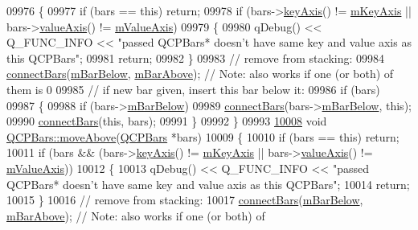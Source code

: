 \begin{DoxyCode}
09976 \{
09977   \textcolor{keywordflow}{if} (bars == \textcolor{keyword}{this}) \textcolor{keywordflow}{return};
09978   \textcolor{keywordflow}{if} (bars->\hyperlink{a00024_a72c7a09c22963f2c943f07112b311103}{keyAxis}() != \hyperlink{a00024_a692421b963472fa6e16156a74ba96832}{mKeyAxis} || bars->\hyperlink{a00024_a3106f9d34d330a6097a8ec5905e5b519}{valueAxis}() != 
      \hyperlink{a00024_acfc46d619ab9598be33b64146da45822}{mValueAxis})
09979   \{
09980     qDebug() << Q\_FUNC\_INFO << \textcolor{stringliteral}{"passed QCPBars* doesn't have same key and value axis as this QCPBars"};
09981     \textcolor{keywordflow}{return};
09982   \}
09983   \textcolor{comment}{// remove from stacking:}
09984   \hyperlink{a00027_a6ea37802cd22f97235cab614b14b9f19}{connectBars}(\hyperlink{a00027_a02eb7de7a2c03dc5699f329bb1c5f6e1}{mBarBelow}, \hyperlink{a00027_ade19776a2a6d393f15c0e27d4bb8e594}{mBarAbove}); \textcolor{comment}{// Note: also works if one (or both) of
       them is 0}
09985   \textcolor{comment}{// if new bar given, insert this bar below it:}
09986   \textcolor{keywordflow}{if} (bars)
09987   \{
09988     \textcolor{keywordflow}{if} (bars->\hyperlink{a00027_a02eb7de7a2c03dc5699f329bb1c5f6e1}{mBarBelow})
09989       \hyperlink{a00027_a6ea37802cd22f97235cab614b14b9f19}{connectBars}(bars->\hyperlink{a00027_a02eb7de7a2c03dc5699f329bb1c5f6e1}{mBarBelow}, \textcolor{keyword}{this});
09990     \hyperlink{a00027_a6ea37802cd22f97235cab614b14b9f19}{connectBars}(\textcolor{keyword}{this}, bars);
09991   \}
09992 \}
09993 
\hypertarget{a00115_source_l10008}{}\hyperlink{a00027_ac22e00a6a41509538c21b04f0a57318c}{10008} \textcolor{keywordtype}{void} \hyperlink{a00027_ac22e00a6a41509538c21b04f0a57318c}{QCPBars::moveAbove}(\hyperlink{a00027}{QCPBars} *bars)
10009 \{
10010   \textcolor{keywordflow}{if} (bars == \textcolor{keyword}{this}) \textcolor{keywordflow}{return};
10011   \textcolor{keywordflow}{if} (bars && (bars->\hyperlink{a00024_a72c7a09c22963f2c943f07112b311103}{keyAxis}() != \hyperlink{a00024_a692421b963472fa6e16156a74ba96832}{mKeyAxis} || bars->\hyperlink{a00024_a3106f9d34d330a6097a8ec5905e5b519}{valueAxis}() != 
      \hyperlink{a00024_acfc46d619ab9598be33b64146da45822}{mValueAxis}))
10012   \{
10013     qDebug() << Q\_FUNC\_INFO << \textcolor{stringliteral}{"passed QCPBars* doesn't have same key and value axis as this QCPBars"};
10014     \textcolor{keywordflow}{return};
10015   \}
10016   \textcolor{comment}{// remove from stacking:}
10017   \hyperlink{a00027_a6ea37802cd22f97235cab614b14b9f19}{connectBars}(\hyperlink{a00027_a02eb7de7a2c03dc5699f329bb1c5f6e1}{mBarBelow}, \hyperlink{a00027_ade19776a2a6d393f15c0e27d4bb8e594}{mBarAbove}); \textcolor{comment}{// Note: also works if one (or both) of
}
\end{DoxyCode}
